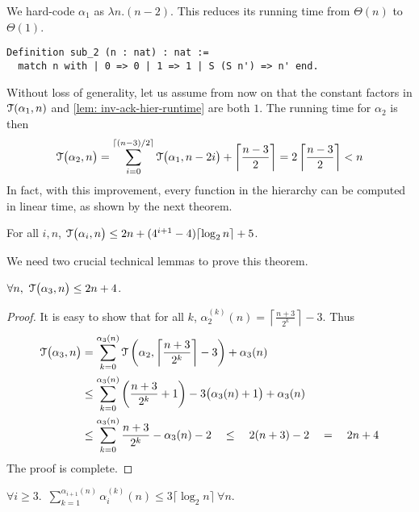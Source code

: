 We hard-code $\alpha_1$ as $\lambda n.(n-2)$. This reduces its running time 
from $\Theta(n)$ to $\Theta(1)$.
\begin{lstlisting}
Definition sub_2 (n : nat) : nat := 
  match n with | 0 => 0 | 1 => 1 | S (S n') => n' end.
\end{lstlisting}
Without loss of generality, let us assume from now on that the constant factors in $\mathcal{T}(\alpha_1, n)$ and \cref{lem: inv-ack-hier-runtime} are both $1$. The running time for $\alpha_2$ is then
\begin{equation*}
\mathcal{T}\big(\alpha_2, n\big)
 = \sum_{i=0}^{\lceil (n-3)/2 \rceil} \mathcal{T} \big(\alpha_1, n-2i\big) + \left\lceil \frac{n-3}{2} \right\rceil =  2\left\lceil \frac{n-3}{2} \right\rceil
 < n 
\end{equation*}
In fact, with this improvement, every function in the hierarchy can be computed in linear time, as shown by the next theorem.
\begin{thm} \label{thm: inv-ack-hier-runtime-improved}
	For all $i, n$, $\mathcal{T}\big(\alpha_i, n\big) \le 2n + (4^{i+1} - 4)\lceil \log_2n\rceil + 5$.
\end{thm}
We need two crucial technical lemmas to prove this theorem.
\begin{lem} \label{lem: inv-ack-3-runtime}
	$\forall n,~\mathcal{T}\big(\alpha_3, n\big) \le 2n + 4$.
\end{lem}
\begin{proof}
	It is easy to show that for all $k$, $\alpha_2^{(k)}(n) = \left\lceil \frac{n+3}{2^k} \right\rceil - 3$. Thus
	\begin{equation*}
	\begin{aligned}
	\mathcal{T}\big(\alpha_3, n\big) & =
	\sum_{k=0}^{\alpha_{3}(n)}\mathcal{T}\left(\alpha_2, \left\lceil \frac{n+3}{2^k} \right\rceil - 3\right) + \alpha_{3}(n)  \\ 
	& \le \sum_{k=0}^{\alpha_3(n)}\left(\frac{n+3}{2^k} + 1\right) - 3\big(\alpha_3(n) + 1\big) + \alpha_3(n) \\
	& \le \sum_{k=0}^{\alpha_3(n)}\frac{n+3}{2^k} - \alpha_3(n) - 2 \quad \le \quad 2(n+3) - 2 \quad = \quad 2n + 4
	\end{aligned}
	\end{equation*}
	The proof is complete.
\end{proof}
\begin{lem} \label{lem: sum-alpha-repeat}
	$\forall i \ge 3$.~$\displaystyle \sum_{k=1}^{\alpha_{i+1}(n)} \alpha_i^{(k)}(n) \le 3\big\lceil \log_2n \big\rceil \ \forall n$.
\end{lem}
